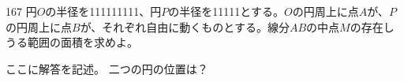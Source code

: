\begin{prob}{167}{}{}
 円$O$の半径を111111111、円$P$の半径を11111とする。$O$の円周上に点$A$が、$P$の円周上に点$B$が、それぞれ自由に動くものとする。線分$AB$の中点$M$の存在しうる範囲の面積を求めよ。 
\end{prob}
ここに解答を記述。
二つの円の位置は？